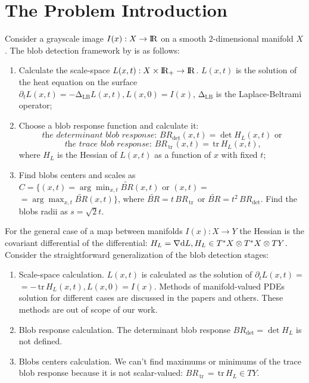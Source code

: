 \documentclass{llncs}
\newcommand{\LaplaceBeltrami}{\mathrm{\Delta_{{LB}}}}
\newcommand{\partderiv}[2]{\partial_{#2} {#1}}
\newcommand{\toreal}{\rightarrow\bbbr}
\newcommand{\CovariantDiff}{\nabla}
\newcommand{\Diff}{\mathrm{d}}
\newcommand{\TangentBundle}[1]{T{#1}}
\newcommand{\CotangentBundle}[1]{\tensor*{T}{^{*}}{#1}}
\newcommand {\tr}{{\,}\mathrm{tr}{\,}}
\begin{document}
\section{The Problem Introduction}
Consider a grayscale image $I(x):X \toreal$ on a smooth 2-dimensional manifold $X$. The blob detection framework by \cite{ScalarBlob3D} is as follows:
\begin{enumerate} 
\item Calculate the scale-space $L(x,t):X\times \bbbr_{+} \toreal$. $L(x,t)$ is the solution of the heat equation on the surface
  $\partderiv{L(x, t)}{t}=-\LaplaceBeltrami{ L(x, t)},L(x, 0)=I(x)$, $\LaplaceBeltrami$ is the Laplace-Beltrami operator;
\item Choose a blob response function and calculate it: 
\begin{equation} \textit{ the determinant blob response: } BR_{\det}(x, t)=\det{H_L(x,t)}\textrm{  or } \label{blob_det}\end{equation} 
\begin{equation} \textit{ the trace blob response: } BR_{\tr}(x, t)=\tr {H_L(x,t)}, \label{blob_tr}											\end{equation} 
 where $H_L$ is the Hessian of $L(x, t)$ as a function of $x$ with fixed $t$;
\item Find blobs centers and scales as $C=\{(x, t)=\arg \min_{x,t} \tilde{BR}(x, t)\textrm{  or } (x, t)=$
$=\arg \max_{x,t}\tilde{BR}(x, t)\}$, where 
$\tilde{BR}=t\,BR_{\tr}$ or $\tilde{BR}=t^2\,BR_{\det}$. Find the blobs radii as $s=\sqrt{2} t$.
\end{enumerate}

For the general case of a map between manifolds $I(x):X \to Y$ the Hessian is the covariant differential of the differential: $H_L=\CovariantDiff \Diff L,H_L \in \CotangentBundle{X}\otimes\CotangentBundle{X}\otimes\TangentBundle{Y}$. Consider the straightforward generalization of the blob detection stages:
\begin{enumerate}
\item Scale-space calculation. $L(x,t)$ is calculated as the solution of $\partderiv{L(x, t)}{t}=$ $=-\tr H_L(x, t), L(x, 0)=I(x)$. Methods of manifold-valued PDEs solution for different cases are discussed in the papers \cite{Harmonic,Kimmel,DTI} and others. These methods are out of scope of our work.
\item Blob response calculation. The determinant blob response $BR_{\det}=\det H_L$ is not defined. 
\item Blobs centers calculation. We can't find maximums or minimums of the trace blob response because it is not scalar-valued: $BR_{\tr}=\tr{H_L} \in TY$.
\end{enumerate} 
\end{document}
